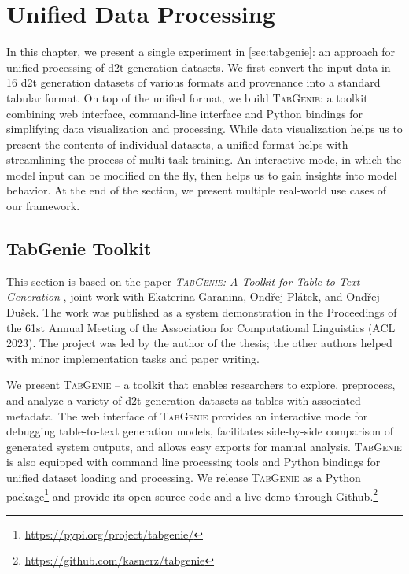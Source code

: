 
\chapter{Unified Data Processing}
\label{chap:tabgenie}

In this chapter, we present a single experiment in \autoref{sec:tabgenie}: an approach for unified processing of \ac{d2t} generation datasets. We first convert the input data in 16 \ac{d2t} generation datasets of various formats and provenance into a standard tabular format. On top of the unified format, we build \textsc{TabGenie}: a toolkit combining web interface, command-line interface and Python bindings for simplifying data visualization and processing. While data visualization helps us to present the contents of individual datasets, a unified format helps with streamlining the process of multi-task training. An interactive mode, in which the model input can be modified on the fly, then helps us to gain insights into model behavior. At the end of the section, we present multiple real-world use cases of our framework.


\section{TabGenie Toolkit}
\label{sec:tabgenie}

\begin{refbox}
    This section is based on the paper \emph{\textsc{TabGenie}: A Toolkit for Table-to-Text Generation} \cite{kasnerTabGenieToolkitTabletoText2023}, joint work with Ekaterina Garanina, Ondřej Plátek, and Ondřej Dušek. The work was published as a system demonstration in the Proceedings of the 61st Annual Meeting of the Association for Computational Linguistics (ACL 2023). The project was led by the author of the thesis; the other authors helped with minor implementation tasks and paper writing.
\end{refbox}


We present \textsc{TabGenie} -- a toolkit that enables researchers to explore, preprocess, and analyze a variety of \ac{d2t} generation datasets as tables with associated metadata. The web interface of \textsc{TabGenie} provides an interactive mode for debugging table-to-text generation models, facilitates side-by-side comparison of generated system outputs, and allows easy exports for manual analysis. \textsc{TabGenie} is also equipped with command line processing tools and Python bindings for unified dataset loading and processing. We release \textsc{TabGenie} as a Python package\footnote{\url{https://pypi.org/project/tabgenie/}} and provide its open-source code and a live demo through Github.\footnote{\url{https://github.com/kasnerz/tabgenie}}


